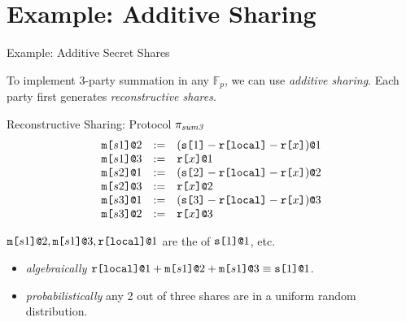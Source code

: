 \documentclass{beamer}
\begin{document}
\section{Example: Additive Sharing}
\begin{frame}{Example: Additive Secret Shares}

  To implement 3-party summation in any $\mathbb{F}_p$, we can use \emph{additive sharing}.
  Each party first generates \emph{reconstructive shares}.
  
  \begin{block}{Reconstructive Sharing: Protocol $\pi_{\mathit{sum3}}$}
    $$
    \begin{array}{lll}
      \texttt{m[}s1\texttt{]}\texttt{@}2 &:=& (\texttt{s[}1\texttt{]} - \texttt{r[}\mathtt{local}\texttt{]} - \texttt{r[}x\texttt{]})\texttt{@}1 \\ 
      \texttt{m[}s1\texttt{]}\texttt{@}3 &:=& \texttt{r[}x\texttt{]}\texttt{@}1 \\ 
      \texttt{m[}s2\texttt{]}\texttt{@}1 &:=& (\texttt{s[}2\texttt{]} - \texttt{r[}\mathtt{local}\texttt{]} - \texttt{r[}x\texttt{]})\texttt{@}2 \\ 
      \texttt{m[}s2\texttt{]}\texttt{@}3 &:=& \texttt{r[}x\texttt{]}\texttt{@}2 \\ 
      \texttt{m[}s3\texttt{]}\texttt{@}1 &:=& (\texttt{s[}3\texttt{]} - \texttt{r[}\mathtt{local}\texttt{]} - \texttt{r[}x\texttt{]})\texttt{@}3 \\ 
      \texttt{m[}s3\texttt{]}\texttt{@}2 &:=& \texttt{r[}x\texttt{]}\texttt{@}3
    \end{array}
    $$
  \end{block}
  $\texttt{m[}s1\texttt{]}\texttt{@}2, \texttt{m[}s1\texttt{]}\texttt{@}3, \texttt{r[}\mathtt{local}\texttt{]}\texttt{@}1$ are the  of $\texttt{s[}1\texttt{]}\texttt{@}1$,
    etc.
  \begin{itemize}
  \item \emph{algebraically} $\texttt{r[}\mathtt{local}\texttt{]}\texttt{@}1 + \texttt{m[}s1\texttt{]}\texttt{@}2 + \texttt{m[}s1\texttt{]}\texttt{@}3 \equiv \texttt{s[}1\texttt{]}\texttt{@}1$.
  \item \emph{probabilistically} any 2 out of three shares are in a uniform random distribution.
  \end{itemize}
  
\end{frame}
\end{document}
